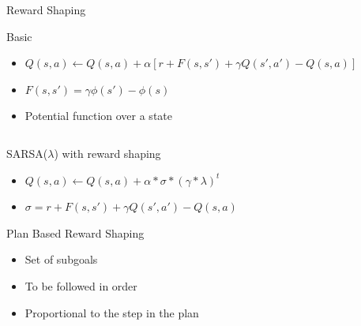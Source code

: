 \documentclass{bredelebeamer}
\begin{document}
\begin{frame}{Reward Shaping}

\begin{block}{Basic}
\begin{itemize}
\item $Q(s, a) \leftarrow  Q(s, a) +  \alpha [r + F(s, s') + \gamma Q(s', a') - Q(s,a)]$
\item $F(s, s') =\gamma \phi (s') - \phi (s)$
\item Potential function over a state
\end{itemize}
\end{block}

\begin{columns}[onlytextwidth]

\begin{column}{0.6\linewidth}

\begin{block}{SARSA($\lambda$) with reward shaping}
\begin{itemize}
\item $Q(s, a) \leftarrow  Q(s, a) +  \alpha *  \sigma *  (\gamma * \lambda)^t$
\item $\sigma = r + F(s, s') + \gamma Q(s', a') - Q(s,a)$
\end{itemize}
\end{block}

\begin{block}{Plan Based Reward Shaping}
\begin{itemize}
\item Set of subgoals
\item To be followed in order
\item Proportional to the step in the plan
\end{itemize}
\end{block}

\end{column}

\begin{column}{0.4\linewidth}


\end{column}
\end{columns}
\end{frame}
\end{document}
